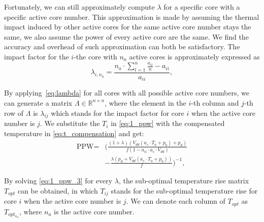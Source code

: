 Fortunately, we can still approximately compute $\lambda$ for a
specific core with a specific active core number. This approximation is made by assuming the thermal impact
induced by other active cores for the same active core number stays
the same, we also assume the power of every active core are the
same. We find the accuracy and overhead of such approximation can both
be satisfactory. The impact factor for the $i$-the core with $n_a$
active cores is approximately expressed as
\begin{equation}\label{eq:lambda}
\lambda _{i,n_a} =\frac{n_a \cdot \sum_{l=1}^{n}\frac{a_{il}}{n}-a_{ii}}{a_{ii}},
\end{equation}





By applying~\eqref{eq:lambda} for all cores with all possible active core
numbers, we can generate a matrix $\Lambda \in \mathbb{R}^{n\times
  n}$, where the element in the $i$-th column and $j$-th row of
$\Lambda$ is $\lambda_{ij}$ which stands for the impact factor for
core $i$ when the active core number is $j$. We substitute the $T_{i}$
in \eqref{eq:1_ppw} with the compensated temperature in
\eqref{eq:t_compensation} and get: 
\begin{equation}\label{eq:1_ppw_3}
\begin{split}
\text{PPW} =& (\frac{(1+\lambda)(V_{dd}(a_{s}\cdot T_{a}+p_{0})+p_{d})}{f(1-a_{ii} \cdot a_{s} \cdot V_{dd})}\\
&-\frac{\lambda(p_{d}+V_{dd}(a_{s}\cdot T_{a}+p_{0}))}{f})^{-1},
\end{split}
\end{equation}

By solving \eqref{eq:1_ppw_3} for every $\lambda$, the sub-optimal temperature rise matrix $T_{opt}$ can be obtained, in which $T_{ij}$ stands for the sub-optimal temperature rise for core $i$ when the active core number is $j$. We can denote each column of $T_{opt}$ as $T_{opt_{n_{a}}}$, where $n_{a}$ is the active core number. 

